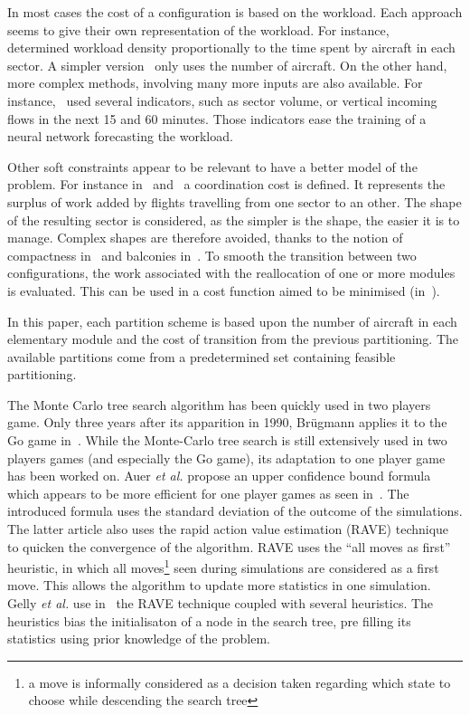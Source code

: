 \documentclass[oneside,twocolumn]{article}
\begin{document}
In most cases the cost of a configuration is based on the workload. Each
approach seems to give their own representation of the workload. For instance,
~\cite{bedouet2016towards} determined workload density proportionally to the time
spent by aircraft in each sector. A simpler version~\cite{sergeeva2017dynamic}
only uses the number of aircraft. On the other hand, more complex methods,
involving many more inputs are also available. For
instance,~\cite{gianazza2010forecasting} used several indicators, such as sector
volume, or vertical incoming flows in the next 15 and 60 minutes. Those
indicators ease the training of a neural network forecasting the workload.

Other soft constraints appear to be relevant to have a better model of
the problem. For instance in~\cite{sergeeva2017dynamic}
and~\cite{bedouet2016towards} a
coordination cost is defined. It represents the surplus of work added by
flights travelling from one sector to an other. The shape of the
resulting sector is considered, as the simpler is
the shape, the easier it is to manage. Complex shapes are therefore avoided,
thanks to the notion of compactness in~\cite{jagare2013airspace} and balconies
in~\cite{sergeeva2017dynamic}. To smooth the transition between two
configurations, the work associated with the reallocation of one or more modules
is evaluated. This can be used in a cost function aimed to be minimised
(in~\cite{bedouet2016towards}).

In this paper, each partition scheme is based upon the number of aircraft in
each
elementary module and the cost of transition from the previous partitioning. The
available partitions come from a predetermined set containing feasible
partitioning.

The Monte Carlo tree search algorithm has been quickly used in two players game.
Only three years after its apparition in 1990, Br\"ugmann applies it to the Go
game in~\cite{brugmann1993mcgo}. While the Monte-Carlo tree search is still
extensively used in two players games (and especially the Go game), its
adaptation to one player game has been worked on. Auer \textit{et al.} propose
an
upper confidence bound formula which appears to be more efficient for one player
games as seen in~\cite{sebag2010fuse}. The introduced formula uses the standard
deviation of the outcome of the simulations.
The latter article also uses the rapid
action value estimation (RAVE) technique to quicken the convergence of the
algorithm. RAVE uses the ``all moves as first'' heuristic, in which all
moves\footnote{a move is informally considered as a decision taken regarding
which state to choose while descending the search tree}
seen during simulations are considered as a first move. This allows the
algorithm to update more statistics in one simulation. Gelly \textit{et al.} use
in~\cite{gelly2012grand} the RAVE technique coupled with several heuristics. The
heuristics bias the initialisaton of a node in the search tree, pre filling its
statistics using prior knowledge of the problem.
\end{document}
